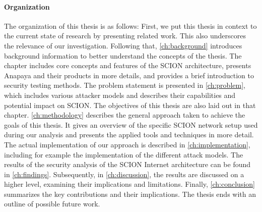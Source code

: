 

\paragraph{Organization}
\label{sec:intro:organization}

The organization of this thesis is as follows:
First, we put this thesis in context to the current state of research by presenting related work.
This also underscores the relevance of our investigation.
Following that, \cref{ch:background} introduces background information to better understand the concepts of the thesis.
The chapter includes core concepts and features of the SCION architecture, presents Anapaya and their products in more details, and provides a brief introduction to security testing methods.
The problem statement is presented in \cref{ch:problem}, which includes various attacker models and describes their capabilities and potential impact on SCION.
The objectives of this thesis are also laid out in that chapter.
\cref{ch:methodology} describes the general approach taken to achieve the goals of this thesis.
It gives an overview of the specific SCION network setup used during our analysis and presents the applied tools and techniques in more detail.
The actual implementation of our approach is described in \cref{ch:implementation}, including for example the implementation of the different attack models.
The results of the security analysis of the SCION Internet architecture can be found in \cref{ch:findings}.
Subsequently, in \cref{ch:discussion}, the results are discussed on a higher level, examining their implications and limitations.
Finally, \cref{ch:conclusion} summarizes the key contributions and their implications.
The thesis ends with an outline of possible future work.

